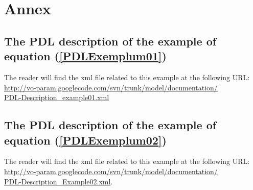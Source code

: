\documentclass[a4paper,11pt] {ivoa}
\begin{document}
\section{Annex}

\subsection{The PDL description of the example of equation (\ref{PDLExemplum01})}\label{Exemplum1XML}
The reader will find the xml file related to this example at the following URL:\\
\href{http://vo-param.googlecode.com/svn/trunk/model/documentation/PDL-Description_example01.xml}{http://vo-param.googlecode.com/svn/trunk/model/documentation/\\PDL-Description\_example01.xml}


\subsection{The PDL description of the example of equation (\ref{PDLExemplum02})}\label{Exemplum2XML}
The reader will find the xml file related to this example at the following URL:\\ 
\href{http://vo-param.googlecode.com/svn/trunk/model/documentation/PDL-Description_Example02.xml}{http://vo-param.googlecode.com/svn/trunk/model/documentation/\\PDL-Description\_Example02.xml}.
\end{document}
